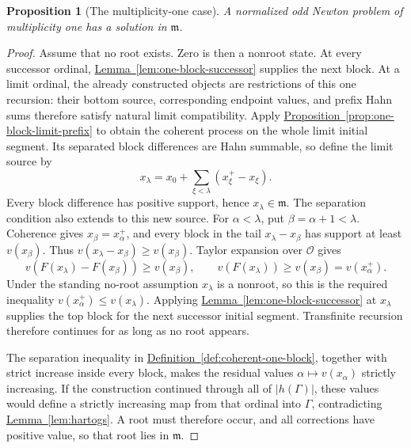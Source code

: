 \documentclass[11pt]{article}
\newcommand{\Val}{v}
\newcommand{\Ocal}{\mathcal O}
\newcommand{\namedref}[2]{\hyperref[#2]{#1~\ref*{#2}}}
\theoremstyle{proofnote}
\newtheorem{proposition}[theorem]{Proposition}
\begin{document}
\begin{proposition}[The multiplicity-one case]
\label{prop:multiplicity-one-core}
  A normalized odd Newton problem of multiplicity one has a solution in
  \(\mathfrak m\).
\end{proposition}
\begin{proof}
  Assume that no root exists.  Zero is then a nonroot state.  At every
  successor ordinal, \namedref{Lemma}{lem:one-block-successor} supplies the
  next block.  At a limit ordinal, the already constructed objects are
  restrictions of this one recursion: their bottom source, corresponding
  endpoint values, and prefix Hahn sums therefore satisfy natural limit
  compatibility.  Apply
  \namedref{Proposition}{prop:one-block-limit-prefix} to obtain the coherent
  process on the whole limit initial segment.  Its separated block
  differences are Hahn summable, so define the limit source by
  \[
    x_\lambda=x_0+
      \sum_{\xi<\lambda}(x_\xi^+-x_\xi).
  \]
  Every block difference has positive support, hence
  \(x_\lambda\in\mathfrak m\).  The separation condition also extends to
  this new source.  For \(\alpha<\lambda\), put \(\beta=\alpha+1<\lambda\).
  Coherence gives \(x_\beta=x_\alpha^+\), and every block in the tail
  \(x_\lambda-x_\beta\) has support at least \(v(x_\beta)\).
  Thus \(\Val(x_\lambda-x_\beta)\ge v(x_\beta)\).  Taylor expansion over
  \(\Ocal\) gives
  \[
    \Val(F(x_\lambda)-F(x_\beta))\ge v(x_\beta),
    \qquad
    \Val(F(x_\lambda))\ge v(x_\beta)=v(x_\alpha^+).
  \]
  Under the standing no-root assumption \(x_\lambda\) is a nonroot, so
  this is the required inequality \(v(x_\alpha^+)\le v(x_\lambda)\).
  Applying \namedref{Lemma}{lem:one-block-successor} at
  \(x_\lambda\) supplies the top block for the next successor initial
  segment.  Transfinite recursion therefore continues for as long as no root
  appears.

  The separation inequality in
  \namedref{Definition}{def:coherent-one-block}, together with strict
  increase inside every block, makes the residual values
  \(\alpha\mapsto v(x_\alpha)\) strictly increasing.  If the construction
  continued through all of \(|h(\Gamma)|\), these values would define a strictly
  increasing map from that ordinal into \(\Gamma\), contradicting
  \namedref{Lemma}{lem:hartogs}.  A root must therefore occur, and all corrections
  have positive value, so that root lies in \(\mathfrak m\).
\end{proof}
\end{document}
